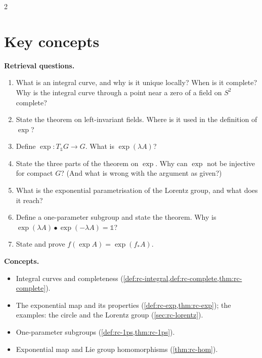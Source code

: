 \begin{paracol}{2}
\section*{Key concepts}
\begin{keyconcepts}
\textbf{Retrieval questions.}
\begin{enumerate}
  \item What is an integral curve, and why is it unique locally? When is it complete? Why is the integral curve through a point near a zero of a field on $S^2$ complete?
  \item State the theorem on left-invariant fields. Where is it used in the definition of $\exp$?
  \item Define $\exp\colon T_{\mathbb 1}G\to G$. What is $\exp(\lambda A)$?
  \item State the three parts of the theorem on $\exp$. Why can $\exp$ not be injective for compact $G$? (And what is wrong with the argument as given?)
  \item What is the exponential parametrisation of the Lorentz group, and what does it reach?
  \item Define a one-parameter subgroup and state the theorem. Why is $\exp(\lambda A)\bullet\exp(-\lambda A)=\mathbb 1$?
  \item State and prove $f(\exp A)=\exp(f_*A)$.
\end{enumerate}
\textbf{Concepts.}
\begin{itemize}
  \item Integral curves and completeness (\cref{def:rc-integral,def:rc-complete,thm:rc-complete}).
  \item The exponential map and its properties (\cref{def:rc-exp,thm:rc-exp}); the examples: the circle and the Lorentz group (\cref{sec:rc-lorentz}).
  \item One-parameter subgroups (\cref{def:rc-1ps,thm:rc-1ps}).
  \item Exponential map and Lie group homomorphisms (\cref{thm:rc-hom}).
\end{itemize}
\end{keyconcepts}

\flushside
\end{paracol}
